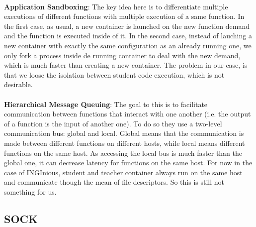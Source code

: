 \paragraph{}\textbf{Application Sandboxing}: The key idea here is to differentiate multiple executions of different functions with multiple execution of a same function.  In the first case, as usual, a new container is launched on the new function demand and the function is executed inside of it.  In the second case, instead of lauching a new container with exactly the same configuration as an already running one, we only fork a process inside de running container to deal with the new demand, which is much faster than creating a new container.  The problem in our case, is that we loose the isolation between student code execution, which is not desirable.
\paragraph{}\textbf{Hierarchical Message Queuing}: The goal to this is to facilitate communication between functions that interact with one another (i.e. the output of a function is the input of another one).  To do so they use a two-level communication bus: global and local.  Global means that the communication is made between different functions on different hosts, while local means different functions on the same host.  As accessing the local bus is much faster than the global one, it can decrease latency for functions on the same host.  For now in the case of INGInious, student and teacher container always run on the same host and communicate though the mean of file descriptors.  So this is still not something for us.  %


\subsection{SOCK} \label{subsec-sock}
